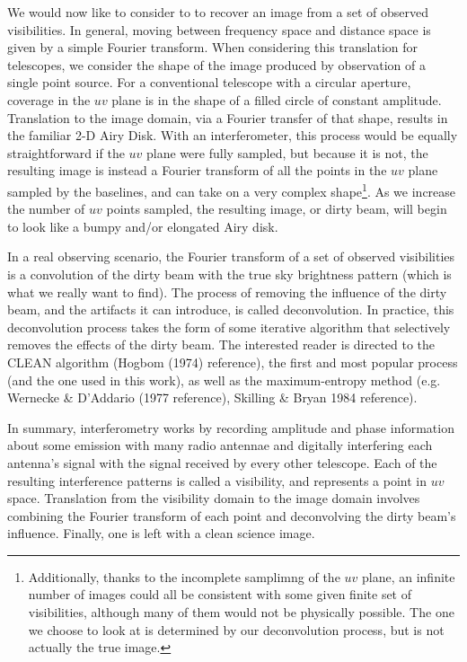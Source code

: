 We would now like to consider to to recover an image from a set of observed visibilities. In general, moving between frequency space and distance space is given by a simple Fourier transform. When considering this translation for telescopes, we consider the shape of the image produced by observation of a single point source. For a conventional telescope with a circular aperture, coverage in the $uv$ plane is in the shape of a filled circle of constant amplitude. Translation to the image domain, via a Fourier transfer of that shape, results in the familiar 2-D Airy Disk. With an interferometer, this process would be equally straightforward if the $uv$ plane were fully sampled, but because it is not, the resulting image is instead a Fourier transform of all the points in the $uv$ plane sampled by the baselines, and can take on a very complex shape\footnote{Additionally, thanks to the incomplete samplimng of the $uv$ plane, an infinite number of images could all be consistent with some given finite set of visibilities, although many of them would not be physically possible. The one we choose to look at is determined by our deconvolution process, but is not actually the true image.}. As we increase the number of $uv$ points sampled, the resulting image, or dirty beam, will begin to look like a bumpy and/or elongated Airy disk.

In a real observing scenario, the Fourier transform of a set of observed visibilities is a convolution of the dirty beam with the true sky brightness pattern (which is what we really want to find). The process of removing the influence of the dirty beam, and the artifacts it can introduce, is called deconvolution. In practice, this deconvolution process takes the form of some iterative algorithm that selectively removes the effects of the dirty beam. The interested reader is directed to the CLEAN algorithm (Hogbom (1974) reference), the first and most popular process (and the one used in this work), as well as the maximum-entropy method (e.g. Wernecke & D’Addario (1977 reference), Skilling & Bryan 1984 reference).

In summary, interferometry works by recording amplitude and phase information about some emission with many radio antennae and digitally interfering each antenna's signal with the signal received by every other telescope. Each of the resulting interference patterns is called a visibility, and represents a point in $uv$ space. Translation from the visibility domain to the image domain involves combining the Fourier transform of each point and deconvolving the dirty beam's influence. Finally, one is left with a clean science image.

